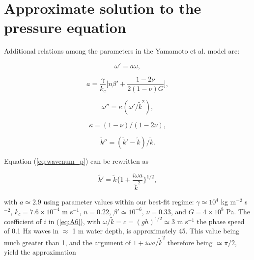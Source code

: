 \chapter{\label{a:A1}Approximate solution to the \cite{Yamamoto_etal1978} pressure equation}


Additional relations among the parameters in the Yamamoto et al. model are:

\begin{equation}\label{eq:A1}
\omega' = a \omega,
\end{equation}

\begin{equation}\label{eq:A2}
a = \frac{\gamma}{k_c}\bigg[n\beta' + \frac{1-2\nu}{2(1-\nu)G}\bigg],
\end{equation}

\begin{equation}\label{eq:A3}
\omega'' = \kappa(\omega'/\tilde{k}^2),
\end{equation}

\begin{equation}\label{eq:A4}
\kappa = (1-\nu)/(1-2\nu),
\end{equation}

\begin{equation}\label{eq:A5}
\tilde{k}'' = (\tilde{k}'-\tilde{k})/\tilde{k}.
\end{equation}

Equation (\ref{eq:wavenum_p}) can be rewritten as

\begin{equation}\label{eq:A6}
\tilde{k}' = \tilde{k}\Big\{1 + \frac{i\omega a}{\tilde{k}^2}\Big\}^{1/2},
\end{equation}

\noindent with $a \simeq 2.9$ using parameter values within our best-fit regime: $\gamma \simeq 10^{4}$ kg m$^{-2}$ s$^{-2}$, $k_c=7.6\times10^{-4}$ m s$^{-1}$, $n=0.22$, $\beta'\simeq 10^{-6}$, $\nu=0.33$, and $G=4\times10^{8}$ Pa. The coefficient of $i$ in (\ref{eq:A6}), with $\omega/\tilde{k}=c=(gh)^{1/2}\simeq 3$ m s$^{-1}$ the phase speed of 0.1 Hz waves in $\approx$ 1 m water depth, is approximately 45. This value being much greater than 1, and the argument of $1 + i\omega a/\tilde{k}^2$ therefore being $\simeq\pi/2$, yield the approximation


